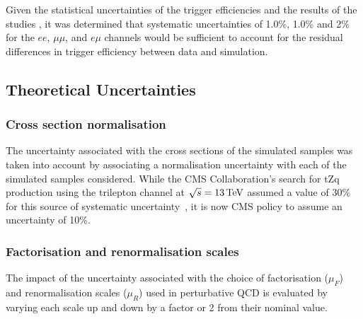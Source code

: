 %

Given the statistical uncertainties of the trigger efficiencies and the results of the studies , it was determined that systematic uncertainties of 1.0\%, 1.0\% and 2\% for the $ee$, $\mu\mu$, and $e \mu$ channels would be sufficient to account for the residual differences in trigger efficiency between data and simulation.

\subsection{Theoretical Uncertainties}\label{sec:theorySysts}
\subsubsection{Cross section normalisation}
The uncertainty associated with the cross sections of the simulated samples was taken into account by associating a normalisation uncertainty with each of the simulated samples considered.
While the CMS Collaboration's search for tZq production using the trilepton channel at $\sqrt{s} = 13\,\text{Te\hspace{-.08em}V}$ assumed a value of 30\% for this source of systematic uncertainty~\cite{Sirunyan:2017nbr}, it is now CMS policy to assume an uncertainty of 10\%.

\subsubsection{Factorisation and renormalisation scales}
The impact of the uncertainty associated with the choice of factorisation ($\mu_{F}$) and renormalisation scales ($\mu_{R}$) used in perturbative QCD is evaluated by varying each scale up and down by a factor or 2 from their nominal value.

